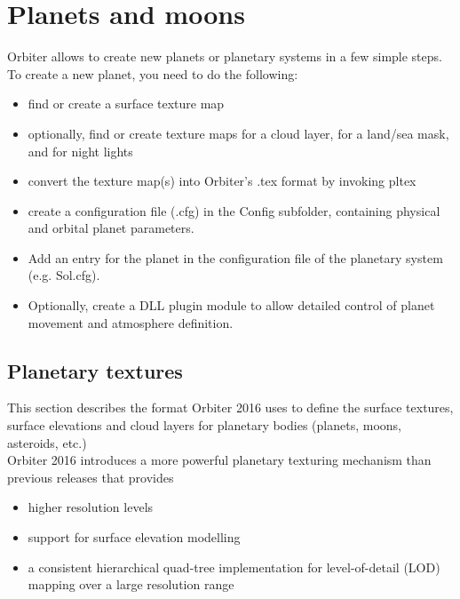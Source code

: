\documentclass[Orbiter Developer Manual.tex]{subfiles}
\begin{document}
\section{Planets and moons}
Orbiter allows to create new planets or planetary systems in a few simple steps. To create a new planet, you need to do the following:

\begin{itemize}
\item find or create a surface texture map
\item optionally, find or create texture maps for a cloud layer, for a land/sea mask, and for night lights
\item convert the texture map(s) into Orbiter's .tex format by invoking pltex
\item create a configuration file (.cfg) in the Config subfolder, containing physical and orbital planet parameters.
\item Add an entry for the planet in the configuration file of the planetary system (e.g. Sol.cfg).
\item Optionally, create a DLL plugin module to allow detailed control of planet movement and atmosphere definition.
\end{itemize}


\subsection{Planetary textures}
\label{ssec:planetery_tex}
This section describes the format Orbiter 2016 uses to define the surface textures, surface elevations and cloud layers for planetary bodies (planets, moons, asteroids, etc.)\\
Orbiter 2016 introduces a more powerful planetary texturing mechanism than previous releases that provides

\begin{itemize}
\item higher resolution levels
\item support for surface elevation modelling
\item a consistent hierarchical quad-tree implementation for level-of-detail (LOD) mapping over a large resolution range
\end{itemize}
\end{document}
